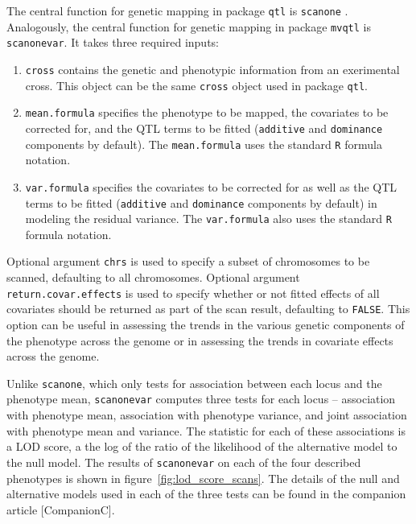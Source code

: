 \documentclass[9pt,twocolumn,twoside]{gsag3jnl}
\begin{document}
The central function for genetic mapping in package \texttt{qtl} is \texttt{scanone} \citep{Broman2003}.
Analogously, the central function for genetic mapping in package \texttt{mvqtl} is \texttt{scanonevar}.
It takes three required inputs:

\begin{enumerate}
    \item \texttt{cross} contains the genetic and phenotypic information from an exerimental cross.  This object can be the same \texttt{cross} object used in package \texttt{qtl}.
    \item \texttt{mean.formula} specifies the phenotype to be mapped, the covariates to be corrected for, and the QTL terms to be fitted (\texttt{additive} and \texttt{dominance} components by default).  The \texttt{mean.formula} uses the standard \texttt{R} formula notation.
    \item \texttt{var.formula} specifies the covariates to be corrected for as well as the QTL terms to be fitted (\texttt{additive} and \texttt{dominance} components by default) in modeling the residual variance.  The \texttt{var.formula} also uses the standard \texttt{R} formula notation.
\end{enumerate}

Optional argument \texttt{chrs} is used to specify a subset of chromosomes to be scanned, defaulting to all chromosomes.
Optional argument \texttt{return.covar.effects} is used to specify whether or not fitted effects of all covariates should be returned as part of the scan result, defaulting to \texttt{FALSE}.
This option can be useful in assessing the trends in the various genetic components of the phenotype across the genome or in assessing the trends in covariate effects across the genome.

Unlike \texttt{scanone}, which only tests for association between each locus and the phenotype mean, \texttt{scanonevar} computes three tests for each locus -- association with phenotype mean, association with phenotype variance, and joint association with phenotype mean and variance.
The statistic for each of these associations is a LOD score, a the log of the ratio of the likelihood of the alternative model to the null model.
The results of \texttt{scanonevar} on each of the four described phenotypes is shown in figure~\ref{fig:lod_score_scans}.
The details of the null and alternative models used in each of the three tests can be found in the companion article [CompanionC].
\end{document}
